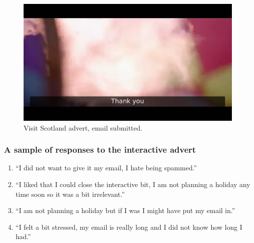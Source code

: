 	\begin{figure}[th]
		\centering
		\includegraphics[width=\textwidth,height=0.5\textheight,keepaspectratio]{images/adverts/visit_scotland-3.png}
		\caption{Visit Scotland advert, email submitted.}
		\label{fig:visit_scotland3}
	\end{figure}

\subsubsection*{A sample of responses to the interactive advert}
	\begin{enumerate}
		\item{``I did not want to give it my email, I hate being spammed.''}
		\item{``I liked that I could close the interactive bit, I am not planning a holiday any time soon so it was a bit irrelevant.''}
		\item{``I am not planning a holiday but if I was I might have put my email in.''}
		\item{``I felt a bit stressed, my email is really long and I did not know how long I had.''}
	\end{enumerate}
